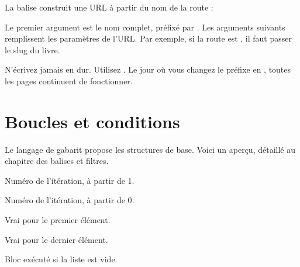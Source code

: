La balise  construit une URL à partir du nom de la route :


Le premier argument est le nom complet, préfixé par . Les arguments
suivants remplissent les paramètres de l'URL. Par exemple, si la route est
, il faut passer le slug du livre.

\begin{bonne}
N'écrivez jamais  en dur. Utilisez
. Le jour où vous changez le préfixe  en
, toutes les pages continuent de fonctionner.
\end{bonne}

\section{Boucles et conditions}

Le langage de gabarit propose les structures de base. Voici un aperçu, détaillé au
chapitre des balises et filtres.


\begin{description}[leftmargin=3.3cm,style=nextline]
  \item[\code{forloop.counter}] Numéro de l'itération, à partir de 1.
  \item[\code{forloop.counter0}] Numéro de l'itération, à partir de 0.
  \item[\code{forloop.first}] Vrai pour le premier élément.
  \item[\code{forloop.last}] Vrai pour le dernier élément.
  \item[\code{\{\% empty \%\}}] Bloc exécuté si la liste est vide.
\end{description}

